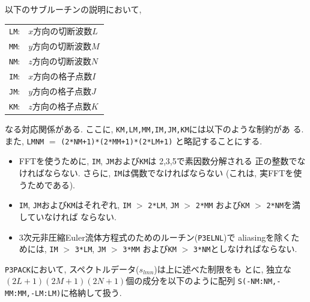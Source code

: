 \documentclass[a4j,fleqn]{jarticle}
\begin{document}
以下のサブルーチンの説明において,
\begin{center}
\begin{tabular}{rl}
{\tt LM}:& $x$方向の切断波数$L$\\
{\tt MM}:& $y$方向の切断波数$M$\\
{\tt NM}:& $z$方向の切断波数$N$\\
{\tt IM}:& $x$方向の格子点数$I$\\
{\tt JM}:& $y$方向の格子点数$J$\\
{\tt KM}:& $z$方向の格子点数$K$
\end{tabular}
\end{center}
なる対応関係がある. ここに, {\tt KM,LM,MM,IM,JM,KM}には以下のような制約があ
る. また, {\tt LMNM} $=$ {\tt (2*NM+1)*(2*MM+1)*(2*LM+1)}
と略記することにする.

\begin{itemize}
\item FFTを使うために, {\tt IM}, {\tt JM}および{\tt KM}は
2,3,5で素因数分解される
正の整数でなければならない. さらに, {\tt IM}は偶数でなければならない
(これは, 実FFTを使うためである).

\item {\tt IM}, {\tt JM}および{\tt KM}はそれぞれ, 
{\tt IM} $>$ {\tt 2*LM}, {\tt JM} $>$ {\tt 2*MM}
および{\tt KM} $>$ {\tt 2*NM}を満していなければ
ならない.

\item 3次元非圧縮Euler流体方程式のためのルーチン({\tt P3ELNL})で
aliasingを除くためには, 
{\tt IM} $>$ {\tt 3*LM}, {\tt JM} $>$ {\tt 3*MM}
および{\tt KM} $>$ {\tt 3*NM}としなければならない.
\end{itemize}

{\tt P3PACK}において, スペクトルデータ($s_{lmn}$)は上に述べた制限をも
とに, 独立な$(2L+1)(2M+1)(2N+1)$個の成分を以下のように配列
{\tt S(-NM:NM,-MM:MM,-LM:LM)}に格納して扱う.
\end{document}
